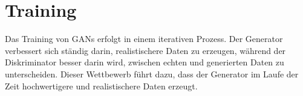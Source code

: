 \section{Training}

\noindent Das Training von GANs erfolgt in einem iterativen Prozess. Der Generator verbessert sich ständig darin, realistischere Daten zu erzeugen, während der Diskriminator besser darin wird, zwischen echten und generierten Daten zu unterscheiden. Dieser Wettbewerb führt dazu, dass der Generator im Laufe der Zeit hochwertigere und realistischere Daten erzeugt.

\newpage